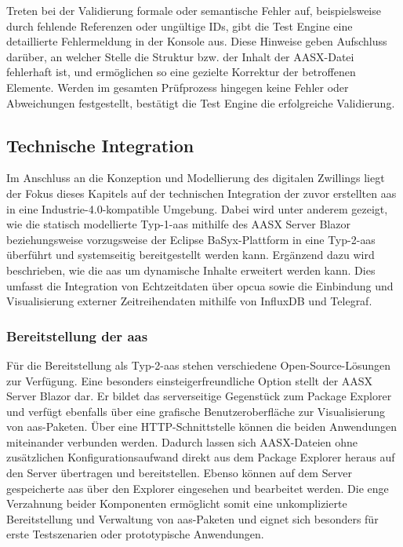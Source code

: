 Treten bei der Validierung formale oder semantische Fehler auf, beispielsweise durch fehlende Referenzen oder ungültige IDs, gibt die Test Engine eine detaillierte Fehlermeldung in der Konsole aus. 
Diese Hinweise geben Aufschluss darüber, an welcher Stelle die Struktur bzw. der Inhalt der AASX-Datei fehlerhaft ist, und ermöglichen so eine gezielte Korrektur der betroffenen Elemente. 
Werden im gesamten Prüfprozess hingegen keine Fehler oder Abweichungen festgestellt, bestätigt die Test Engine die erfolgreiche Validierung.

\subsection{Technische Integration}
Im Anschluss an die Konzeption und Modellierung des digitalen Zwillings liegt der Fokus dieses Kapitels auf der technischen Integration der zuvor erstellten \acs{aas} in eine Industrie-4.0-kompatible Umgebung.
Dabei wird unter anderem gezeigt, wie die statisch modellierte Typ-1-\acs{aas} mithilfe des AASX Server Blazor beziehungsweise vorzugsweise der Eclipse BaSyx-Plattform in eine Typ-2-\acs{aas} überführt und systemseitig bereitgestellt werden kann.
Ergänzend dazu wird beschrieben, wie die \acs{aas} um dynamische Inhalte erweitert werden kann.
Dies umfasst die Integration von Echtzeitdaten über \acs{opcua} sowie die Einbindung und Visualisierung externer Zeitreihendaten mithilfe von InfluxDB und Telegraf.

\subsubsection{Bereitstellung der \acs{aas}}
\label{sec:bereitstellungAAS}
Für die Bereitstellung als Typ-2-\acs{aas} stehen verschiedene Open-Source-Lösungen zur Verfügung. 
Eine besonders einsteigerfreundliche Option stellt der AASX Server Blazor \cite{AASXServer} dar.
Er bildet das serverseitige Gegenstück zum Package Explorer und verfügt ebenfalls über eine grafische Benutzeroberfläche zur Visualisierung von \acs{aas}-Paketen.
Über eine HTTP-Schnittstelle können die beiden Anwendungen miteinander verbunden werden.
Dadurch lassen sich AASX-Dateien ohne zusätzlichen Konfigurationsaufwand direkt aus dem Package Explorer heraus auf den Server übertragen und bereitstellen.
Ebenso können auf dem Server gespeicherte \acs{aas} über den Explorer eingesehen und bearbeitet werden.
Die enge Verzahnung beider Komponenten ermöglicht somit eine unkomplizierte Bereitstellung und Verwaltung von \acs{aas}-Paketen und eignet sich besonders für erste Testszenarien oder prototypische Anwendungen.

